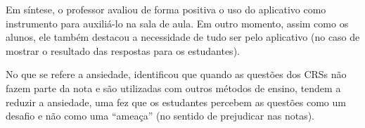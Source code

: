 Em síntese, o professor avaliou de forma positiva o uso do aplicativo como instrumento para auxiliá-lo
na sala de aula. Em outro momento, assim como os alunos, ele também destacou a necessidade de tudo
ser pelo aplicativo (no caso de mostrar o resultado das respostas para os estudantes).

No que se refere a ansiedade,  identificou que quando as questões dos CRSs não
fazem parte da nota e são utilizadas com outros métodos de ensino, tendem a reduzir a ansiedade,
uma fez que os estudantes percebem as questões como um desafio e não como uma ``ameaça''
(no sentido de prejudicar nas notas).
